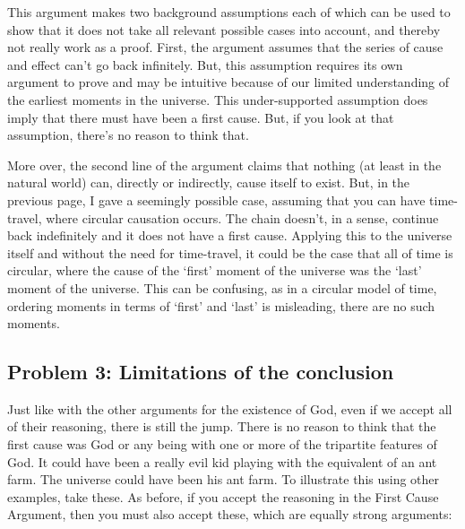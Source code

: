 This argument makes two background assumptions each of which can be used to show that it does not take all relevant possible cases into account, and thereby not really work as a proof. First, the argument assumes that the series of cause and effect can’t go back infinitely. But, this assumption requires its own argument to prove and may be intuitive because of our limited understanding of the earliest moments in the universe. This under-supported assumption does imply that there must have been a first cause. But, if you look at that assumption, there’s no reason to think that.

More over, the second line of the argument claims that nothing (at least in the natural world) can, directly or indirectly, cause itself to exist. But, in the previous page, I gave a seemingly possible case, assuming that you can have time-travel, where circular causation occurs. The chain doesn't, in a sense, continue back indefinitely and it does not have a first cause. Applying this to the universe itself and without the need for time-travel, it could be the case that all of time is circular, where the cause of the `first' moment of the universe was the `last' moment of the universe. This can be confusing, as in a circular model of time, ordering moments in terms of `first' and `last' is misleading, there are no such moments. 
\subsection{Problem 3: Limitations of the conclusion}

Just like with the other arguments for the existence of God, even if we accept all of their reasoning, there is still the jump. There is no reason to think that the first cause was God or any being with one or more of the tripartite features of God. It could have been a really evil kid playing with the equivalent of an ant farm. The universe could have been his ant farm. To illustrate this using other examples, take these. As before, if you accept the reasoning in the First Cause Argument, then you must also accept these, which are equally strong arguments:


